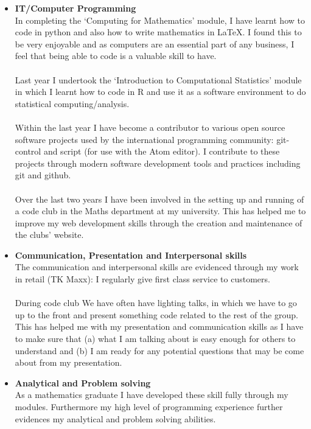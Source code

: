 \documentclass[a4paper]{res}
\begin{document}
\begin{resume}
\begin{itemize}
\item \textbf{IT/Computer Programming} \\
In completing the ‘Computing for Mathematics’ module, I have learnt how to code
in python and also how to write mathematics in \LaTeX. I found this to be very
enjoyable and as computers are an essential part of any business, I feel that
being able to code is a valuable skill to have. \\
\\
Last year I undertook the ‘Introduction to Computational Statistics’ module in
which I learnt how to code in R and use it as a software environment to do
statistical computing/analysis. \\
\\
Within the last year I have become a contributor to various open source software
projects used by the international programming community: git-control and script
(for use with the Atom editor). I contribute to these projects through modern
software development tools and practices including git and github. \\
\\
Over the last two years I have been involved in the setting up and running of a
code club in the Maths department at my university. This has helped me to
improve my web development skills through the creation and maintenance of the
clubs' website. \\

\item \textbf{Communication, Presentation and Interpersonal skills} \\
The communication and interpersonal skills are evidenced through my work in
retail (TK Maxx): I regularly give first class service to customers.\\
\\
During code club We have often have lighting talks, in which we have to go
up to the front and present something code related to the rest of the group.
This has helped me with my presentation and communication skills as I have to
make sure that (a) what I am talking about is easy enough for others to
understand and (b) I am ready for any potential questions that may be come about
from my presentation. \\

\item \textbf{Analytical and Problem solving} \\
As a mathematics graduate I have developed these skill fully through my
modules. Furthermore my high level of programming experience further
evidences my analytical and problem solving abilities.\\


\end{itemize}
\end{resume}
\end{document}
